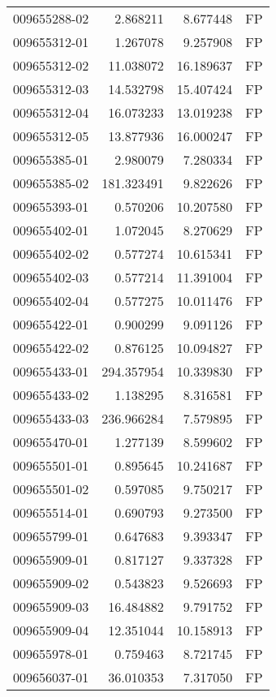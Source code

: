 \begin{tabular}{lrrl}
009655288-02 &    2.868211 &     8.677448 &   FP \\
009655312-01 &    1.267078 &     9.257908 &   FP \\
009655312-02 &   11.038072 &    16.189637 &   FP \\
009655312-03 &   14.532798 &    15.407424 &   FP \\
009655312-04 &   16.073233 &    13.019238 &   FP \\
009655312-05 &   13.877936 &    16.000247 &   FP \\
009655385-01 &    2.980079 &     7.280334 &   FP \\
009655385-02 &  181.323491 &     9.822626 &   FP \\
009655393-01 &    0.570206 &    10.207580 &   FP \\
009655402-01 &    1.072045 &     8.270629 &   FP \\
009655402-02 &    0.577274 &    10.615341 &   FP \\
009655402-03 &    0.577214 &    11.391004 &   FP \\
009655402-04 &    0.577275 &    10.011476 &   FP \\
009655422-01 &    0.900299 &     9.091126 &   FP \\
009655422-02 &    0.876125 &    10.094827 &   FP \\
009655433-01 &  294.357954 &    10.339830 &   FP \\
009655433-02 &    1.138295 &     8.316581 &   FP \\
009655433-03 &  236.966284 &     7.579895 &   FP \\
009655470-01 &    1.277139 &     8.599602 &   FP \\
009655501-01 &    0.895645 &    10.241687 &   FP \\
009655501-02 &    0.597085 &     9.750217 &   FP \\
009655514-01 &    0.690793 &     9.273500 &   FP \\
009655799-01 &    0.647683 &     9.393347 &   FP \\
009655909-01 &    0.817127 &     9.337328 &   FP \\
009655909-02 &    0.543823 &     9.526693 &   FP \\
009655909-03 &   16.484882 &     9.791752 &   FP \\
009655909-04 &   12.351044 &    10.158913 &   FP \\
009655978-01 &    0.759463 &     8.721745 &   FP \\
009656037-01 &   36.010353 &     7.317050 &   FP \\

\end{tabular}
